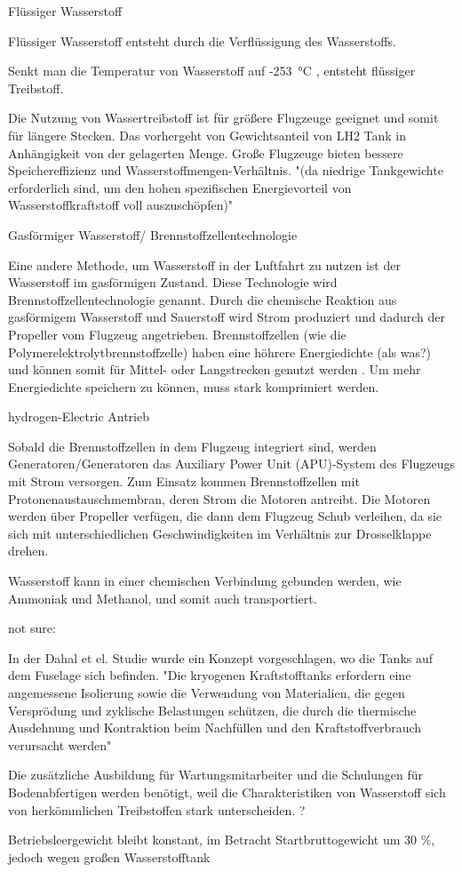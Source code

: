 Flüssiger Wasserstoff

Flüssiger Wasserstoff entsteht durch die Verflüssigung des Wasserstoffs.

Senkt man die Temperatur von Wasserstoff auf -253 °C \cite{colpan2022fuel}, entsteht flüssiger Treibstoff.

Die Nutzung von Wassertreibstoff ist für größere Flugzeuge geeignet und somit für längere Stecken. Das vorhergeht von %
Gewichtsanteil von LH2 Tank in Anhängigkeit von der gelagerten Menge. 
Große Flugzeuge bieten bessere Speichereffizienz und Wasserstoffmengen-Verhältnis.
"(da niedrige Tankgewichte erforderlich sind, um den hohen spezifischen Energievorteil von Wasserstoffkraftstoff voll auszuschöpfen)"
\cite{ansell2023review}


Gasförmiger Wasserstoff/ Brennstoffzellentechnologie

Eine andere Methode, um Wasserstoff in der Luftfahrt zu nutzen ist der Wasserstoff im gasförmigen Zustand. 
Diese Technologie wird Brennstoffzellentechnologie genannt.
Durch die chemische Reaktion aus gasförmigem Wasserstoff  und Sauerstoff  wird Strom produziert \cite{dalmia2022powering} und 
dadurch der Propeller vom Flugzeug angetrieben.
Brennstoffzellen (wie die Polymerelektrolytbrennstoffzelle) haben eine höhrere Energiedichte (als was?) und 
können somit für Mittel- oder Langstrecken genutzt werden \cite{dalmia2022powering}. 
Um mehr Energiedichte speichern zu können, muss  stark komprimiert werden. 

hydrogen-Electric Antrieb

Sobald die Brennstoffzellen in dem Flugzeug integriert sind, werden Generatoren/Generatoren das 
Auxiliary Power Unit (APU)-System des Flugzeugs mit Strom versorgen. Zum Einsatz kommen Brennstoffzellen 
mit Protonenaustauschmembran, deren Strom die Motoren antreibt. Die Motoren werden über Propeller verfügen,
die dann dem Flugzeug Schub verleihen, da sie sich mit unterschiedlichen Geschwindigkeiten im Verhältnis zur Drosselklappe drehen.\cite{dalmia2022powering}

Wasserstoff kann in einer chemischen Verbindung gebunden werden, wie Ammoniak und Methanol, und somit auch transportiert.

not sure:

\cite{dahal2021techno} In der Dahal et el. Studie wurde ein Konzept vorgeschlagen, wo die Tanks auf dem Fuselage sich befinden.
"Die kryogenen Kraftstofftanks erfordern eine angemessene Isolierung sowie die Verwendung von Materialien, die 
gegen Versprödung und zyklische Belastungen schützen, die durch die thermische Ausdehnung und Kontraktion beim Nachfüllen 
und den Kraftstoffverbrauch verursacht werden"

Die zusätzliche Ausbildung für Wartungsmitarbeiter und die Schulungen für Bodenabfertigen
werden benötigt, weil die Charakteristiken von Wasserstoff 
sich von herkömmlichen Treibstoffen stark unterscheiden. \cite{mulder2019outlook}?

Betriebsleergewicht bleibt konstant, im Betracht Startbruttogewicht um 30 \%, jedoch wegen großen Wasserstofftank

